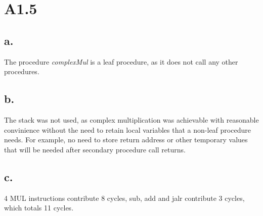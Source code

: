 \section*{A1.5}

\begin{figure}[H]
\end{figure}

\subsection*{a.}
The procedure \textit{complexMul} is a leaf procedure, as it does not call any other procedures.
\subsection*{b.}
The stack was not used, as complex multiplication was achievable with reasonable convinience without the need to retain local variables that a non-leaf procedure needs.
For example, no need to store return address or other temporary values that will be needed after secondary procedure call returns.

\subsection*{c.}
4 MUL instructions contribute 8 cycles, sub, add and jalr contribute 3 cycles, which totals 11 cycles.